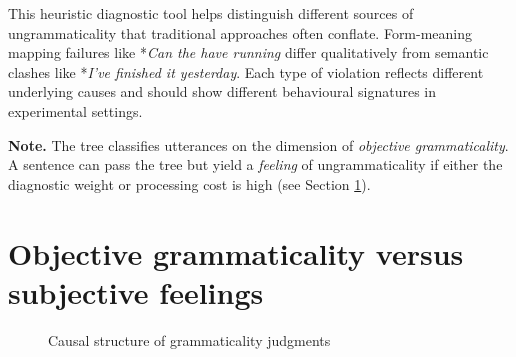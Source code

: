 \documentclass[12pt]{article}
\begin{document}
This heuristic diagnostic tool helps distinguish different sources of ungrammaticality that traditional approaches often conflate. Form-meaning mapping failures like *\textit{Can the have running} differ qualitatively from semantic clashes like *\textit{I've finished it yesterday}. Each type of violation reflects different underlying causes and should show different behavioural signatures in experimental settings.

\begin{tcolorbox}[colback=lsLightBlue!15]
\textbf{Note.} The tree classifies utterances on the dimension of
\emph{objective grammaticality}. A sentence can pass the tree but yield a \emph{feeling} of ungrammaticality if either the diagnostic weight or processing cost is high (see Section \ref{sec:obj-subj}).
\end{tcolorbox}

\section{Objective grammaticality versus subjective feelings}\label{sec:obj-subj}

\begin{figure}[htbp]
\centering
{}
\caption{Causal structure of grammaticality judgments}\label{fig:causal-dag}
\end{figure}
\end{document}
